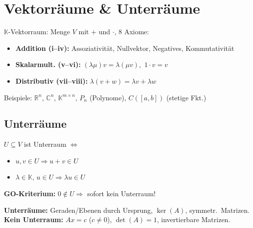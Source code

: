 \documentclass[10pt,a4paper,twocolumn]{article}
\newcommand{\seccol}{black}
\newcommand{\setseccol}[1]{\renewcommand{\seccol}{#1}}
\newcommand{\detail}[1]{{\small\color{detail}#1}}
\begin{document}
	
	\setseccol{c1}
	\section{Vektorräume \& Unterräume}
	
	\begin{tcolorbox}[defbox, title={Def. 5.1.1 — Vektorraum}]
		$\mathbb{K}$-Vektorraum: Menge $V$ mit $+$ und $\cdot$, 8 Axiome:
		\begin{itemize}
			\item \textbf{Addition (i–iv):} Assoziativität, Nullvektor, Negatives, Kommutativität
			\item \textbf{Skalarmult. (v–vi):} $(\lambda\mu)v=\lambda(\mu v)$,\ $1\cdot v=v$
			\item \textbf{Distributiv (vii–viii):} $\lambda(v+w)=\lambda v+\lambda w$
		\end{itemize}
	\end{tcolorbox}
	
	\detail{Beispiele: $\mathbb{R}^n$, $\mathbb{C}^n$, $\mathbb{K}^{m\times n}$, $P_n$ (Polynome), $C([a,b])$ (stetige Fkt.)}
	
	\subsection{Unterräume}
	
	\begin{tcolorbox}[defbox, title={Def. 5.2.1 — Unterraum}]
		$U\subseteq V$ ist Unterraum $\iff$
		\begin{itemize}[leftmargin=1em]
			\item[i)] $u,v\in U \Rightarrow u+v\in U$
			\item[ii)] $\lambda\in\mathbb{K},\,u\in U \Rightarrow \lambda u\in U$
		\end{itemize}
	\end{tcolorbox}
	
	\begin{tcolorbox}[tipbox]
		\textbf{GO-Kriterium:} $0\notin U \Rightarrow$ sofort kein Unterraum!
	\end{tcolorbox}
	
	\detail{%
		\textbf{Unterräume:} Geraden/Ebenen durch Ursprung, $\ker(A)$, symmetr.\ Matrizen.\\
		\textbf{Kein Unterraum:} $Ax=c$ ($c\neq0$), $\det(A)=1$, invertierbare Matrizen.%
	}
	
\end{document}
